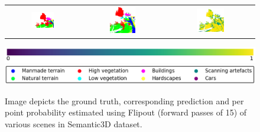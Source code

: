 \begin{figure}[h!]
\begin{tabular}{ccc}
            \includegraphics[width=0.33\textwidth, height=0.18\textheight]{images/seg_output/sem3d_seg_output/3_GT.pdf} &
            \includegraphics[width=0.33\textwidth, height=0.18\textheight]{images/seg_output/flipout/sem3d_3.pdf}& 
            \includegraphics[width=0.33\textwidth, height=0.18\textheight]{images/seg_output/flipout/3_fout_prob.pdf}\\
        \end{tabular}
        \includegraphics[scale=0.45]{images/prob_legend.pdf}
        \includegraphics[scale=0.45]{images/legend.png}
        \caption{Image depicts the ground truth, corresponding prediction and per point probability estimated using Flipout (forward passes of 15) of various scenes in Semantic3D dataset.}
        \label{fig:fout_sem3d_probmap}
    \end{figure}

